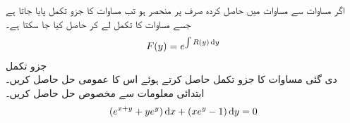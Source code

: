 اگر مساوات  سے مساوات  میں حاصل کردہ   صرف  پر منحصر ہو تب  مساوات  کا جزو تکمل پایا جاتا ہے جسے مساوات  کا تکمل لے کر حاصل کیا جا سکتا ہے۔
\begin{align}\label{مساوات_سادہ_اول_جزو_تکمل__مساوات_ب}
F(y)=e^{\int R(y) \dif y}
\end{align}
\quad جزو تکمل\\
دی گئی مساوات کا جزو تکمل حاصل کرتے ہوئے اس کا عمومی حل حاصل کریں۔ابتدائی معلومات  سے مخصوص حل حاصل کریں۔
\begin{align}\label{مساوات_سادہ_اول_مثال_جزو_تکمل}
(e^{x+y}+ye^y)\dif x+(xe^y-1)\dif y=0
\end{align}

